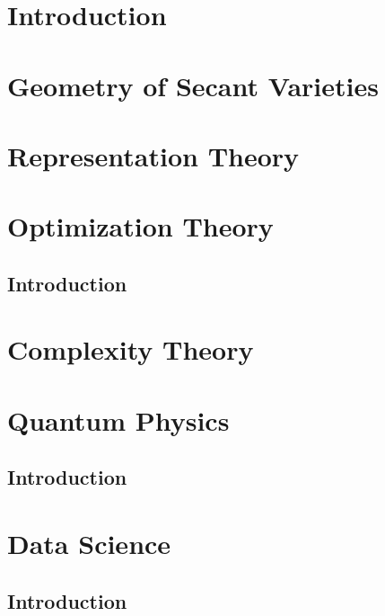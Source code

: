 \documentclass[oneside]{book}
\theoremstyle{plain}
\theoremstyle{definition}
\numberwithin{equation}{subsection}
\begin{document}
\part{Introduction}
\label{part-introduction}


\part{Geometry of Secant Varieties}
\label{part-geometrySecants}


\part{Representation Theory}
\label{part-RepTheory}


\part{Optimization Theory}
\label{part-optimization}

\chapter{Introduction}
\label{optimization-chapter-intro}

\part{Complexity Theory}
\label{part-complexityTheory}


\part{Quantum Physics}
\label{part-quantumph}

\chapter{Introduction}
\label{quantumph-chapter-intro}

\part{Data Science}
\label{part-datascience}

\chapter{Introduction}
\label{datascience-chapter-intro}



\end{document}
